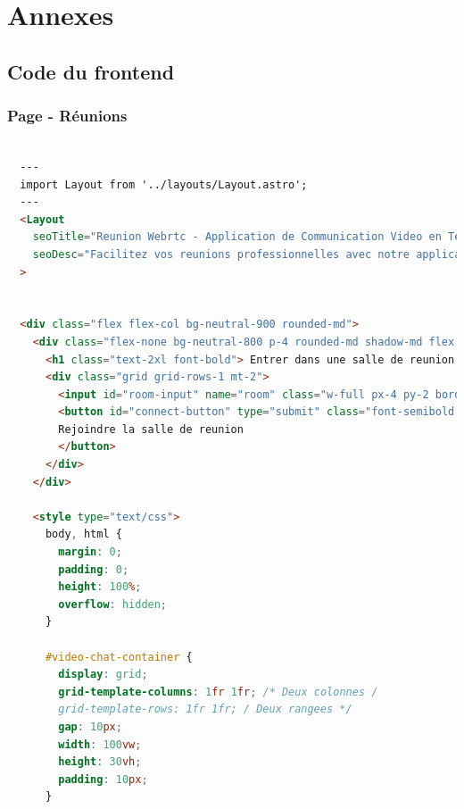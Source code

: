 \documentclass[12pt, a4paper, oneside]{thesis}
\begin{document}
\newpage

\section{Annexes}

\subsection{Code du frontend}

\subsubsection{Page - Réunions}

\begin{lstlisting}[language=HTML, caption={Page - Réunions}, label=Page - Reunions]

  ---
  import Layout from '../layouts/Layout.astro';
  ---
  <Layout
    seoTitle="Reunion Webrtc - Application de Communication Video en Temps Reel | Acody"
    seoDesc="Facilitez vos reunions professionnelles avec notre application de projet Webrtc. Effectuez des appels video en temps reel, abandonnez les appels en un clic, et gerez facilement le son et la camera. Optimisez votre collaboration a distance avec des fonctionnalites simples et efficaces."
  >
  
  
  <div class="flex flex-col bg-neutral-900 rounded-md">
    <div class="flex-none bg-neutral-800 p-4 rounded-md shadow-md flex flex-col">
      <h1 class="text-2xl font-bold"> Entrer dans une salle de reunion </h1>
      <div class="grid grid-rows-1 mt-2">
        <input id="room-input" name="room" class="w-full px-4 py-2 border rounded-md focus:outline-none focus:border-teal-500 bg-neutral-700 col-span-6" placeholder="Numero de votre salle de reunion" />
        <button id="connect-button" type="submit" class="font-semibold w-full bg-teal-500 text-white px-4 py-2 rounded-md hover:bg-teal-700 focus:outline-none col-start-8">
        Rejoindre la salle de reunion
        </button>
      </div>
    </div>
    
    <style type="text/css">
      body, html {
        margin: 0;
        padding: 0;
        height: 100%;
        overflow: hidden;
      }
    
      #video-chat-container {
        display: grid;
        grid-template-columns: 1fr 1fr; /* Deux colonnes /
        grid-template-rows: 1fr 1fr; / Deux rangees */
        gap: 10px;
        width: 100vw;
        height: 30vh;
        padding: 10px;
      }
    

\end{lstlisting}
\end{document}
